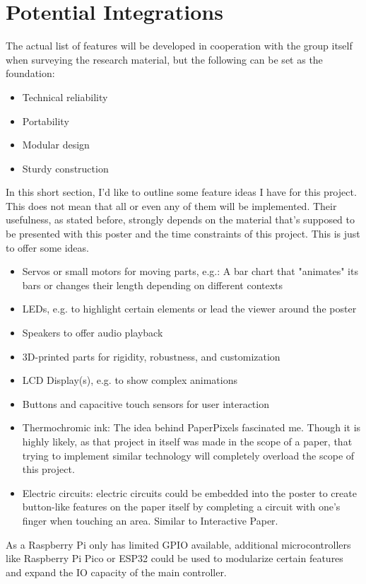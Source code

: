 \section{Potential Integrations}
The actual list of features will be developed in cooperation with the group itself when surveying the research material, but the following can be set as the foundation:
\begin{itemize}
	\item Technical reliability
	\item Portability
	\item Modular design
	\item Sturdy construction
\end{itemize}
In this short section, I'd like to outline some feature ideas I have for this project. This does not mean that all or even any of them will be implemented. Their usefulness, as stated before, strongly depends on the material that's supposed to be presented with this poster and the time constraints of this project. This is just to offer some ideas.
\begin{itemize}
	\item Servos or small motors for moving parts, e.g.: A bar chart that "animates" its bars or changes their length depending on different contexts
	\item LEDs, e.g. to highlight certain elements or lead the viewer around the poster
	\item Speakers to offer audio playback
	\item 3D-printed parts for rigidity, robustness, and customization
	\item LCD Display(s), e.g. to show complex animations
	\item Buttons and capacitive touch sensors for user interaction
	\item Thermochromic ink: The idea behind PaperPixels fascinated me. Though it is highly likely, as that project in itself was made in the scope of a paper, that trying to implement similar technology will completely overload the scope of this project.
	\item Electric circuits: electric circuits could be embedded into the poster to create button-like features on the paper itself by completing a circuit with one's finger when touching an area. Similar to Interactive Paper.
\end{itemize}
As a Raspberry Pi only has limited GPIO available, additional microcontrollers like Raspberry Pi Pico or ESP32 could be used to modularize certain features and expand the IO capacity of the main controller.

